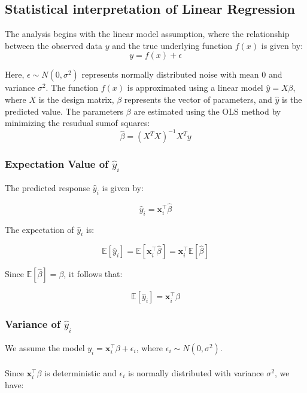 \documentclass{article}
\begin{document}
\subsection{Statistical interpretation of Linear Regression}
The analysis begins with the linear model assumption, where the relationship between the observed data \(y\) and the true underlying function \(f(x)\) is given by:
\[
y = f(x) + \epsilon
\]

Here, \( \epsilon \sim N(0, \sigma^2) \) represents normally distributed noise with mean 0 and variance \( \sigma^2 \). The function \( f(x) \) is approximated using a linear model \( \hat{y} = X\beta \), where \( X \) is the design matrix, \( \beta \) represents the vector of parameters, and \( \hat{y} \) is the predicted value. The parameters \( \beta \) are estimated using the OLS method by minimizing the resudual sumof squares: \[
\hat{\beta} = (X^TX)^{-1}X^Ty
\]
\newline



\subsubsection{Expectation Value of \(\hat{y}_i\)}

The predicted response \(\hat{y}_i\) is given by:

\[
\hat{y}_i = \mathbf{x}_i^\top \hat{\beta}
\]

The expectation of \(\hat{y}_i\) is:

\[
\mathbb{E}[\hat{y}_i] = \mathbb{E}[\mathbf{x}_i^\top \hat{\beta}] = \mathbf{x}_i^\top \mathbb{E}[\hat{\beta}]
\]

Since \(\mathbb{E}[\hat{\beta}] = \beta\), it follows that:

\[
\mathbb{E}[\hat{y}_i] = \mathbf{x}_i^\top \beta
\]
\newline

\subsubsection{Variance of \(\hat{y}_i\)}


We assume the model \( y_i = \mathbf{x}_i^\top \beta + \epsilon_i \), where \( \epsilon_i \sim N(0, \sigma^2) \). \\\\

Since \(\mathbf{x}_i^\top \beta\) is deterministic and \(\epsilon_i\) is normally distributed with variance \(\sigma^2\), we have:
\end{document}
